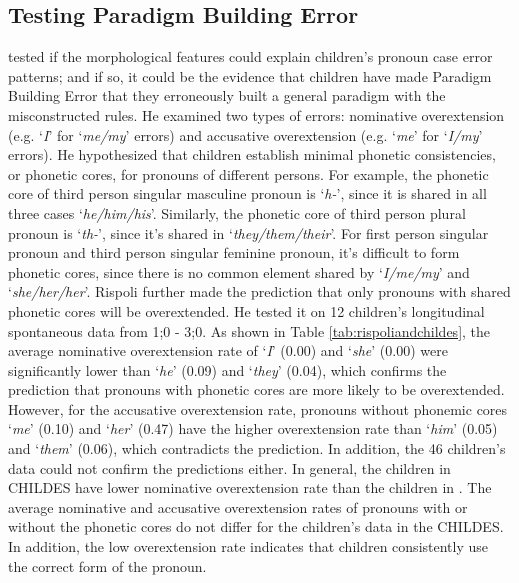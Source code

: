 \subsection{Testing Paradigm Building Error}

\cite{rispoli1994} tested if the morphological features could explain children's pronoun case error patterns; and if so, it could be the evidence that children have made Paradigm Building Error that they erroneously built a general paradigm with the misconstructed rules. He examined two types of errors: nominative overextension (e.g. `\textit{I}' for `\textit{me/my}' errors) and accusative overextension (e.g. `\textit{me}' for `\textit{I/my}' errors). He hypothesized that children establish minimal phonetic consistencies, or phonetic cores, for pronouns of different persons. For example, the phonetic core of third person singular masculine pronoun is `\textit{h-}', since it is shared in all three cases `\textit{he/him/his}'. Similarly, the phonetic core of third person plural pronoun is `\textit{th-}', since it's shared in `\textit{they/them/their}'. For first person singular pronoun and third person singular feminine pronoun, it's difficult to form phonetic cores, since there is no common element shared by `\textit{I/me/my}' and `\textit{she/her/her}'. Rispoli further made the prediction that only pronouns with shared phonetic cores will be overextended. He tested it on 12 children's longitudinal spontaneous data from 1;0 - 3;0. As shown in Table \ref{tab:rispoliandchildes}, the average nominative overextension rate of  `\textit{I}' (0.00) and `\textit{she}' (0.00) were significantly lower than `\textit{he}' (0.09) and `\textit{they}' (0.04), which confirms the prediction that pronouns with phonetic cores are more likely to be overextended. However, for the accusative overextension rate, pronouns without phonemic cores `\textit{me}' (0.10) and `\textit{her}' (0.47) have the higher overextension rate than `\textit{him}' (0.05) and `\textit{them}' (0.06), which contradicts the prediction. In addition, the 46 children's data could not confirm the predictions either. In general, the children in CHILDES have lower nominative overextension rate than the children in \cite{rispoli1994}. The average nominative and accusative overextension rates of pronouns with or without the phonetic cores do not differ for the children's data in the CHILDES. In addition, the low overextension rate indicates that children consistently use the correct form of the pronoun.  
\FloatBarrier

